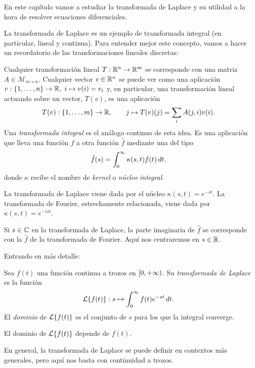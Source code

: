 \documentclass[../ecuaciones_diferenciales.tex]{subfiles}
\begin{document}
En este capítulo vamos a estudiar la transformada de Laplace y su utilidad a la
hora de resolver ecuaciones diferenciales.

La transformada de Laplace es un ejemplo de transformada integral (en
particular, lineal y continua). Para entender mejor este concepto, vamos a
hacer un recordatorio de las transformaciones lineales discretas:

Cualquier transformación lineal \(T : \mathbb{R}^n \to \mathbb{R}^m\) se corresponde con una
matriz \(A \in \mathcal{M}_{m \times n}\). Cualquier vector \(v \in \mathbb{R}^n\) se
puede ver como una aplicación
\(v : \{1, \dots, n\} \to \mathbb{R},\ i \mapsto v(i) = v_i\) y, en particular, una
transformación lineal actuando sobre un vector, \(T(v)\), es una aplicación
\[T(v) : \{1, \dots, m\} \to \mathbb{R}, \qquad j \mapsto T(v)(j) = \sum_i A(j,i)v(i).\]
Una \emph{transformada integral} es el análogo continuo de esta idea. Es una
aplicación que lleva una función \(f\) a otra función \(\hat{f}\) mediante una
 del tipo
\[\hat{f}(s) = \int_0^\infty \kappa(s,t) f(t) \mathop{d\!} t,\]
donde \(\kappa\) recibe el nombre de \emph{kernel} o \emph{núcleo integral}.

La transformada de Laplace viene dada por el núcleo \(\kappa(s,t) =
e^{-st}\). La transformada de Fourier, estrechamente relacionada, viene dada por
\(\kappa(s,t) = e^{-ist}\).

\begin{remark}
	Si \(s \in \mathbb{C}\) en la transformada de Laplace, la parte imaginaria de
	\(\hat{f}\) se corresponde con la \(\hat{f}\) de la transformada de
	Fourier. Aquí nos centraremos en \(s \in \mathbb{R}\).
\end{remark}

Entrando en más detalle:

\begin{definition}
	Sea \(f(t)\) una función continua a trozos en \(\closedopen{0}{+\infty}\). Su
	\emph{transformada de Laplace} es la función
	\[\laplacetrans{f(t)} : s \mapsto \int_0^\infty f(t)e^{-st} \dif t.\]
	El \emph{dominio} de \(\laplacetrans{f(t)}\) es el conjunto de \(s\) para los que la
	integral converge.
\end{definition}

\begin{remark}
	El dominio de \(\laplacetrans{f(t)}\) depende de \(f(t)\).
\end{remark}

\begin{remark}
	En general, la transformada de Laplace se puede definir en contextos más
	generales, pero aquí nos basta con continuidad a trozos.
\end{remark}
\end{document}
